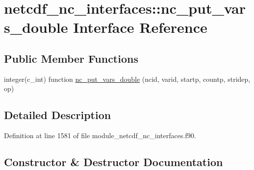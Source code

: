 \hypertarget{interfacenetcdf__nc__interfaces_1_1nc__put__vars__double}{}\section{netcdf\+\_\+nc\+\_\+interfaces\+:\+:nc\+\_\+put\+\_\+vars\+\_\+double Interface Reference}
\label{interfacenetcdf__nc__interfaces_1_1nc__put__vars__double}
\subsection*{Public Member Functions}
\begin{DoxyCompactItemize}
\item 
integer(c\+\_\+int) function \hyperlink{interfacenetcdf__nc__interfaces_1_1nc__put__vars__double_a03c217b60b516cc91b3ae14720c3e242}{nc\+\_\+put\+\_\+vars\+\_\+double} (ncid, varid, startp, countp, stridep, op)
\end{DoxyCompactItemize}


\subsection{Detailed Description}


Definition at line 1581 of file module\+\_\+netcdf\+\_\+nc\+\_\+interfaces.\+f90.



\subsection{Constructor \& Destructor Documentation}
\mbox{\label{interfacenetcdf__nc__interfaces_1_1nc__put__vars__double_a03c217b60b516cc91b3ae14720c3e242}} 
